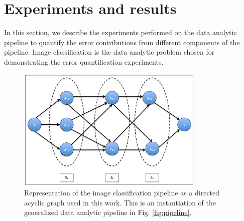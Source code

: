 \section{Experiments and results}
\label{sec4}
In this section, we describe the experiments performed on the data analytic pipeline to quantify the error contributions from different components of the pipeline. Image classification is the data analytic problem chosen for demonstrating the error quantification experiments. 

\begin{figure}[ht!]
    \centering
    \includegraphics[width=0.8\textwidth]{img/EP/pipeline}
    \caption{Representation of the image classification pipeline as a directed acyclic graph used in this work. This is an instantiation of the generalized data analytic pipeline in Fig. \ref{fig:pipeline}.}
    \label{fig:images_pipeline}
\end{figure}
